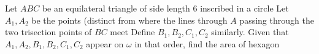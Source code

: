 Let $ABC$ be an equilateral triangle of side length $6$ inscribed in a circle   Let $A_1,A_2$ be the points (distinct from  where the lines through $A$ passing through the two trisection points of $BC$ meet   Define $B_1,B_2,C_1,C_2$ similarly.  Given that $A_1,A_2,B_1,B_2,C_1,C_2$ appear on $\omega$ in that order, find the area of hexagon 